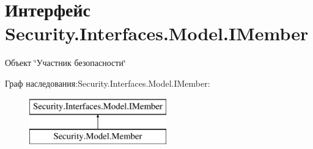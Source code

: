 \hypertarget{interface_security_1_1_interfaces_1_1_model_1_1_i_member}{}\section{Интерфейс Security.\+Interfaces.\+Model.\+I\+Member}
\label{interface_security_1_1_interfaces_1_1_model_1_1_i_member}


Объект \char`\"{}Участник безопасности\char`\"{}  


Граф наследования\+:Security.\+Interfaces.\+Model.\+I\+Member\+:\begin{figure}[H]
\begin{center}
\leavevmode
\includegraphics[height=2.000000cm]{de/d27/interface_security_1_1_interfaces_1_1_model_1_1_i_member}
\end{center}
\end{figure}
